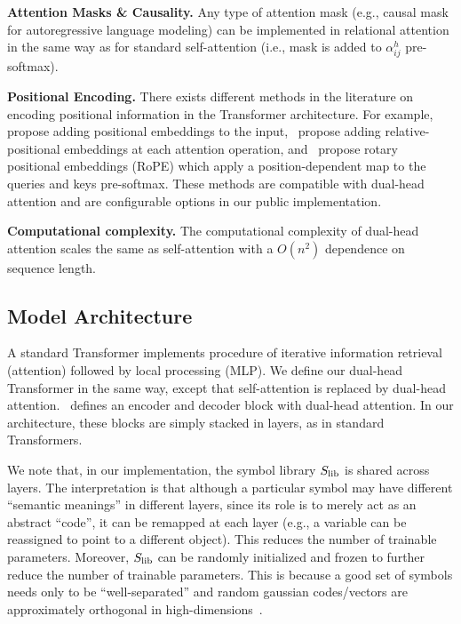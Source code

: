 \textbf{Attention Masks \& Causality.} Any type of attention mask (e.g., causal mask for autoregressive language modeling) can be implemented in relational attention in the same way as for standard self-attention (i.e., mask is added to $\alpha_{ij}^h$ pre-softmax).

\textbf{Positional Encoding.} There exists different methods in the literature on encoding positional information in the Transformer architecture. For example,~\citet{vaswani2017attention} propose adding positional embeddings to the input,~\citet{shawSelfAttentionRelativePosition2018b} propose adding relative-positional embeddings at each attention operation, and~\citet{suRoFormerEnhancedTransformer2023} propose rotary positional embeddings (RoPE) which apply a position-dependent map to the queries and keys pre-softmax. These methods are compatible with dual-head attention and are configurable options in our public implementation.

\textbf{Computational complexity.} The computational complexity of dual-head attention scales the same as self-attention with a $O(n^2)$ dependence on sequence length.


\subsection{Model Architecture}

A standard Transformer implements procedure of iterative information retrieval (attention) followed by local processing (MLP). We define our dual-head Transformer in the same way, except that self-attention is replaced by dual-head attention.~ defines an encoder and decoder block with dual-head attention. In our architecture, these blocks are simply stacked in layers, as in standard Transformers.

We note that, in our implementation, the symbol library $S_\mathrm{lib}$ is shared across layers. The interpretation is that although a particular symbol may have different ``semantic meanings'' in different layers, since its role is to merely act as an abstract ``code'', it can be remapped at each layer (e.g., a variable can be reassigned to point to a different object). This reduces the number of trainable parameters. Moreover, $S_\mathrm{lib}$ can be randomly initialized and frozen to further reduce the number of trainable parameters. This is because a good set of symbols needs only to be ``well-separated'' and random gaussian codes/vectors are approximately orthogonal in high-dimensions~\citep{needcitation?citationonrandomcodes?}.

